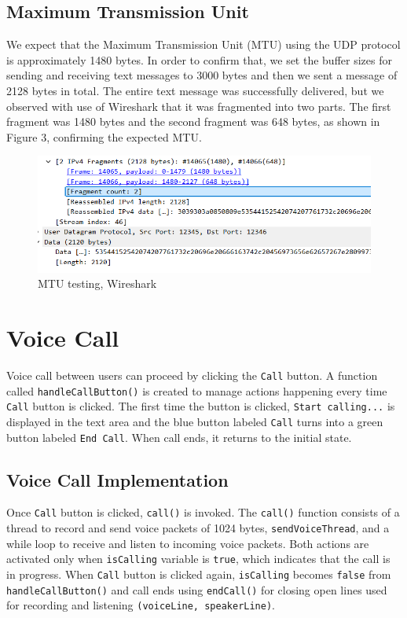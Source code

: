 \documentclass{article}
\begin{document}
\subsection{Maximum Transmission Unit}
We expect that the Maximum Transmission Unit (MTU) using the UDP protocol is approximately 1480 bytes. In order to confirm that, we set the buffer sizes for sending and receiving text messages to 3000 bytes and then we sent a message of 2128 bytes in total. The entire text message was successfully delivered, but we observed with use of Wireshark that it was fragmented into two parts. The first fragment was 1480 bytes and the second fragment was 648 bytes, as shown in Figure 3, confirming the expected MTU.

\begin{figure}[h!]
    \centering
    \includegraphics[width=1\linewidth]{image3.png}
    \caption{MTU testing, Wireshark}
    \label{fig:enter-label}
\end{figure}

\section{Voice Call}
Voice call between users can proceed by clicking the \texttt{Call} button. A function called \texttt{handleCallButton()} is created to manage actions happening every time \texttt{Call} button is clicked. The first time the button is clicked, \texttt{Start calling...} is displayed in the text area and the blue button labeled \texttt{Call} turns into a green button labeled \texttt{End Call}. When call ends, it returns to the initial state.

\subsection{Voice Call Implementation}
Once \texttt{Call} button is clicked, \texttt{call()} is invoked. The \texttt{call()} function consists of a thread to record and send voice packets of 1024 bytes, \texttt{sendVoiceThread}, and a while loop to receive and listen to incoming voice packets. Both actions are activated only when \texttt{isCalling} variable is \texttt{true}, which indicates that the call is in progress. When \texttt{Call} button is clicked again, \texttt{isCalling} becomes \texttt{false} from \texttt{handleCallButton()} and call ends using \texttt{endCall()} for closing open lines used for recording and listening \texttt{(voiceLine, speakerLine)}. 
\end{document}
